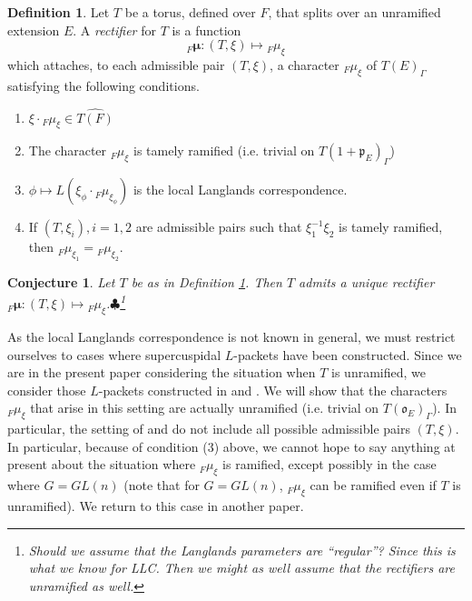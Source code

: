 \documentclass[11pt]{amsart}
\theoremstyle{plain}
\newtheorem{conjecture}[theorem]{Conjecture}
\newcommand{\MAxxx}[1]{$\clubsuit$\footnote{#1}}
\theoremstyle{definition}
\newtheorem{definition}[theorem]{Definition}
\begin{document}
\begin{definition}\label{rectifierdefinition}
  Let $T$ be a torus, defined over $F$, that splits over an unramified
  extension $E$.  A \emph{rectifier} for $T$ is a function $${}_F
  \boldsymbol\mu : (T, \xi) \mapsto {}_F \mu_{\xi}$$ which attaches,
  to each admissible pair $(T, \xi)$, a character ${}_F
  \mu_{\xi}$ of $T(E)_{\Gamma}$ satisfying the following conditions.

\begin{enumerate}
\item $\xi \cdot {}_F \mu_{\xi} \in \widehat{T(F)}$

\item The character ${}_F \mu_{\xi}$ is tamely ramified (i.e. trivial on
  $T(1 + \mathfrak{p}_E)_{\Gamma}$)

\item $\phi \mapsto L(\xi_{\phi} \cdot {}_F \mu_{\xi_{\phi}})$
  is the local Langlands correspondence.

\item If $(T, \xi_i), i = 1,2$ are admissible pairs  such that
$\xi_1^{-1} \xi_2$ is tamely ramified, then
${}_F \mu_{\xi_1} = {}_F \mu_{\xi_2}$.
\end{enumerate}

\end{definition}

\begin{conjecture}
  Let $T$ be as in Definition \ref{rectifierdefinition}.  Then $T$
  admits a unique rectifier ${}_F \boldsymbol\mu : (T, \xi) \mapsto
  {}_F \mu_{\xi}$.\MAxxx{Should we assume that the Langlands parameters
  are ``regular''?  Since this is what we know for LLC.  Then we might
  as well assume that the rectifiers are unramified as well.}
\end{conjecture}

As the local Langlands correspondence is not known in general, we must restrict
ourselves to cases where supercuspidal $L$-packets have been constructed.
Since we are in the present paper considering the situation when $T$ is unramified,
we consider those $L$-packets constructed in \cite{debackerreeder} and \cite{reeder}.
We will show that the characters ${}_F \mu_{\xi}$ that arise in this setting
are actually unramified (i.e. trivial on $T(\mathfrak{o}_E)_{\Gamma}$).  In particular, 
the setting
of \cite{debackerreeder} and \cite{reeder} do not include all possible admissible
pairs $(T, \xi)$.  In particular, because of condition (3) above, we cannot hope
to say anything at present about the situation where ${}_F \mu_{\xi}$ is ramified,
except possibly in the case where $G = GL(n)$ (note that for
$G = GL(n)$, ${}_F \mu_{\xi}$ can be ramified even if $T$ is unramified).
We return to this case in another paper.
\end{document}
